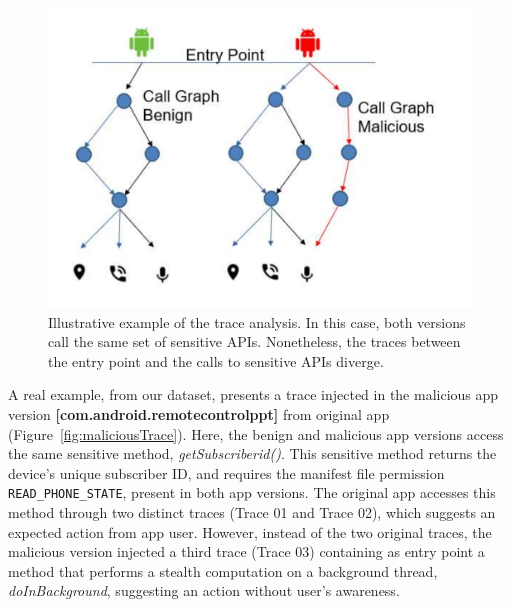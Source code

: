 \begin{figure}[ht]
\centering
\includegraphics[scale=0.30]{images/maliciousCallGraph.pdf}
\caption{Illustrative example of the trace analysis. In this case, both versions call the same set of sensitive APIs. Nonetheless,
the traces between the entry point and the calls to sensitive APIs diverge.}
 \label{fig:callGraph}
\end{figure}


A real example, from our dataset, presents a trace injected in the malicious app version \textbf{[com.android.remotecontrolppt]} from original app (Figure~\ref{fig:maliciousTrace}). Here, the benign and malicious app versions access the same
sensitive method, \textit{getSubscriberid()}. This sensitive method returns the device's unique
subscriber ID, and requires the manifest file permission \texttt{READ\_PHONE\_STATE}, present in both app versions.
The original app accesses this method through two distinct traces (Trace 01 and Trace 02), which suggests an expected action from app user. However,
instead of the two original traces, the malicious version injected a third trace (Trace 03) containing as entry point a method that performs a stealth
computation on a background thread, \textit{doInBackground}, suggesting an action without user's awareness.

